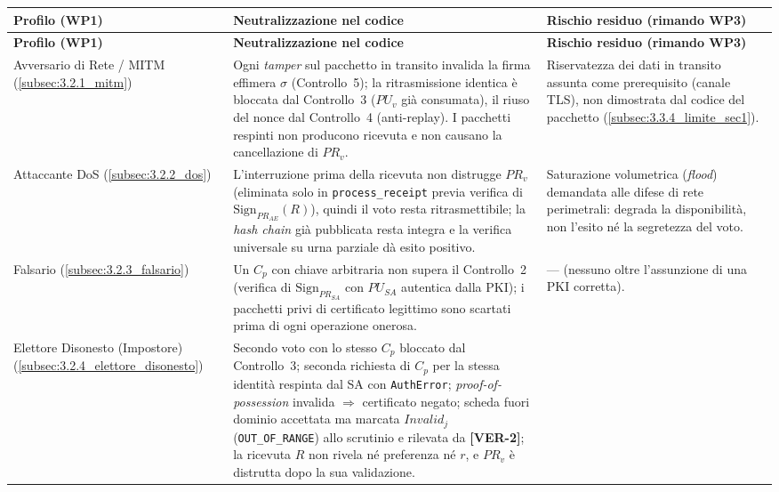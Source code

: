 {\footnotesize
\setlength{\tabcolsep}{4pt}
\renewcommand{\arraystretch}{1.25}
\begin{longtable}{|p{1.9cm}|p{5.15cm}|p{5.15cm}|}
\hline
\textbf{Profilo (WP1)} & \textbf{Neutralizzazione nel codice} & \textbf{Rischio residuo (rimando WP3)} \\
\hline
\endfirsthead
\hline
\textbf{Profilo (WP1)} & \textbf{Neutralizzazione nel codice} & \textbf{Rischio residuo (rimando WP3)} \\
\hline
\endhead
Avversario di Rete / MITM \newline (\ref{subsec:3.2.1_mitm}) &
  Ogni \emph{tamper} sul pacchetto in transito invalida la firma effimera $\sigma$ (Controllo~5); la ritrasmissione identica è bloccata dal Controllo~3 ($PU_v$ già consumata), il riuso del nonce dal Controllo~4 (anti-replay). I pacchetti respinti non producono ricevuta e non causano la cancellazione di $PR_v$. &
  Riservatezza dei dati in transito assunta come prerequisito (canale TLS), non dimostrata dal codice del pacchetto (\ref{subsec:3.3.4_limite_sec1}). \\
\hline
Attaccante DoS \newline (\ref{subsec:3.2.2_dos}) &
  L'interruzione prima della ricevuta non distrugge $PR_v$ (eliminata solo in \texttt{process\_receipt} previa verifica di $\mathrm{Sign}_{PR_{AE}}(R)$), quindi il voto resta ritrasmettibile; la \emph{hash chain} già pubblicata resta integra e la verifica universale su urna parziale dà esito positivo. &
  Saturazione volumetrica (\emph{flood}) demandata alle difese di rete perimetrali: degrada la disponibilità, non l'esito né la segretezza del voto. \\
\hline
Falsario \newline (\ref{subsec:3.2.3_falsario}) &
  Un $C_p$ con chiave arbitraria non supera il Controllo~2 (verifica di $\mathrm{Sign}_{PR_{SA}}$ con $PU_{SA}$ autentica dalla PKI); i pacchetti privi di certificato legittimo sono scartati prima di ogni operazione onerosa. &
  --- (nessuno oltre l'assunzione di una PKI corretta). \\
\hline
Elettore Disonesto (Impostore) \newline (\ref{subsec:3.2.4_elettore_disonesto}) &
  Secondo voto con lo stesso $C_p$ bloccato dal Controllo~3; seconda richiesta di $C_p$ per la stessa identità respinta dal SA con \texttt{AuthError}; \emph{proof-of-possession} invalida $\Rightarrow$ certificato negato; scheda fuori dominio accettata ma marcata $\mathit{Invalid}_j$ (\texttt{OUT\_OF\_RANGE}) allo scrutinio e rilevata da \textbf{[VER-2]}; la ricevuta $R$ non rivela né preferenza né $r$, e $PR_v$ è distrutta dopo la sua validazione. &

\end{longtable}}
